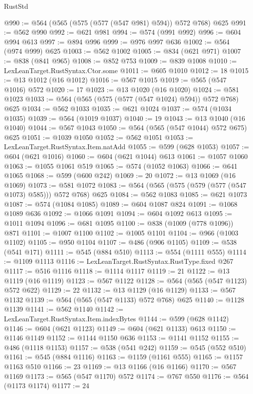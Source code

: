 \begin{lexlean}{RustStd}
\begin{coremodule}
@990 := @564 (@565 (@575 (@577 (@547 @981) @594)) @572 @768) @625
@991 := @562 @990
@992 := @621 @981
@994 := @574 (@991 @992)
@996 := @604 @994 @613
@997 := @894 @996
@999 := @976 @997 @636
@1002 := @564 (@974 @999) @625
@1003 := @562 @1002
@1005 := @834 (@621 @971)
@1007 := @838 (@841 @965)
@1008 := @852 @753
@1009 := @839 @1008
@1010 := LexLeanTarget.RustSyntax.Ctor.some
@1011 := @605 @1010
@1012 := 18
@1015 := @13 @1012 (@16 @1012)
@1016 := @567 @1015
@1019 := @565 (@547 @1016) @572
@1020 := 17
@1023 := @13 @1020 (@16 @1020)
@1024 := @581 @1023
@1033 := @564 (@565 (@575 (@577 (@547 @1024) @594)) @572 @768) @625
@1034 := @562 @1033
@1035 := @621 @1024
@1037 := @574 (@1034 @1035)
@1039 := @564 (@1019 @1037)
@1040 := 19
@1043 := @13 @1040 (@16 @1040)
@1044 := @567 @1043
@1050 := @564 (@565 (@547 @1044) @572 @675) @625
@1051 := @1039 @1050
@1052 := @562 @1051
@1053 := LexLeanTarget.RustSyntax.Item.natAdd
@1055 := @599 (@628 @1053)
@1057 := @604 (@621 @1016)
@1060 := @604 (@621 @1044) @613
@1061 := @1057 @1060
@1063 := @1055 @1061 @519
@1065 := @574 (@1052 @1063)
@1066 := @641 @1065
@1068 := @599 (@600 @242)
@1069 := 20
@1072 := @13 @1069 (@16 @1069)
@1073 := @581 @1072
@1083 := @564 (@565 (@575 (@579 (@577 (@547 @1073) @585))) @572 @768) @625
@1084 := @562 @1083
@1085 := @621 @1073
@1087 := @574 (@1084 @1085)
@1089 := @604 @1087 @824
@1091 := @1068 @1089 @636
@1092 := @1066 @1091
@1094 := @604 @1092 @613
@1095 := @1011 @1094
@1096 := @681 @1095
@1100 := @838 (@1009 (@778 @1096)) @871
@1101 := @1007 @1100
@1102 := @1005 @1101
@1104 := @966 (@1003 @1102)
@1105 := @950 @1104
@1107 := @486 (@906 @1105)
@1109 := @538 (@541 @171)
@1111 := @545 (@884 @510)
@1113 := @554 (@1111 @555)
@1114 := @1109 @1113
@1116 := LexLeanTarget.RustSyntax.RustType.fixed @267
@1117 := @516 @1116
@1118 := @1114 @1117
@1119 := 21
@1122 := @13 @1119 (@16 @1119)
@1123 := @567 @1122
@1128 := @564 (@565 (@547 @1123) @572 @622)
@1129 := 22
@1132 := @13 @1129 (@16 @1129)
@1133 := @567 @1132
@1139 := @564 (@565 (@547 @1133) @572 @768) @625
@1140 := @1128 @1139
@1141 := @562 @1140
@1142 := LexLeanTarget.RustSyntax.Item.indexBytes
@1144 := @599 (@628 @1142)
@1146 := @604 (@621 @1123)
@1149 := @604 (@621 @1133) @613
@1150 := @1146 @1149
@1152 := @1144 @1150 @636
@1153 := @1141 @1152
@1155 := @486 (@1118 @1153)
@1157 := @538 (@541 @242)
@1159 := @545 (@552 @510)
@1161 := @545 (@884 @1116)
@1163 := @1159 (@1161 @555)
@1165 := @1157 @1163 @510
@1166 := 23
@1169 := @13 @1166 (@16 @1166)
@1170 := @567 @1169
@1173 := @565 (@547 @1170) @572
@1174 := @767 @550
@1176 := @564 (@1173 @1174)
@1177 := 24

\end{coremodule}
\end{lexlean}
